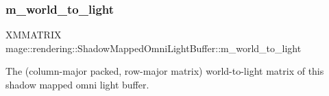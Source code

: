 \subsubsection{\texorpdfstring{m\+\_\+world\+\_\+to\+\_\+light}{m\_world\_to\_light}}
{\footnotesize\ttfamily X\+M\+M\+A\+T\+R\+IX mage\+::rendering\+::\+Shadow\+Mapped\+Omni\+Light\+Buffer\+::m\+\_\+world\+\_\+to\+\_\+light}

The (column-\/major packed, row-\/major matrix) world-\/to-\/light matrix of this shadow mapped omni light buffer. 